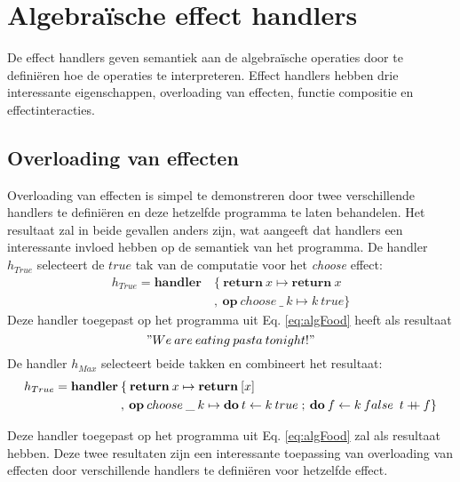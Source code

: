 \section{Algebraïsche effect handlers}
De effect handlers geven semantiek aan de algebraïsche operaties door te definiëren hoe de operaties te interpreteren. Effect handlers hebben drie interessante eigenschappen, overloading van effecten, functie compositie en effectinteracties.

\subsection{Overloading van effecten}
Overloading van effecten is simpel te demonstreren door twee verschillende handlers te definiëren en deze hetzelfde programma te laten behandelen. Het resultaat zal in beide gevallen anders zijn, wat aangeeft dat handlers een interessante invloed hebben op de semantiek van het programma. \newline 
De handler $h_{True}$ selecteert de $true$ tak van de computatie voor het \textit{choose} effect:
\begin{equation}
    \begin{split}
        h_{True} = \textbf{handler} \: & \{ \: \textbf{return}\:x \mapsto \textbf{return}\:x \\
         & , \: \textbf{op}\:choose\:\_\:k \mapsto k \: true\}
    \end{split}
\end{equation}
Deze handler toegepast op het programma uit Eq. \ref{eq:algFood} heeft als resultaat
\begin{equation}
    "We\:are\:eating\:pasta\:tonight!"
\end{equation} 
De handler $h_{Max}$ selecteert beide takken en combineert het resultaat:
\begin{equation}
    \begin{split}
        h_{True} = \textbf{handler} \: & \{ \: \textbf{return}\:x \mapsto \textbf{return}\:[x] \\
        & , \: \textbf{op}\:choose\:\_\:k \mapsto \textbf{do}\:t \leftarrow k \: true\;;\: \textbf{do}\:f \leftarrow k\:false\;\:t \mathbin{{+}\mspace{-8mu}{+}} f \}
    \end{split}
\end{equation}

Deze handler toegepast op het programma uit Eq. \ref{eq:algFood} zal als resultaat
\begin{equation}
    ["We\:are\:eating\:pasta\:tonight!",\:"We\:are\:eating\:pizza\:tonight!"]
\end{equation} 
hebben. Deze twee resultaten zijn een interessante toepassing van overloading van effecten door verschillende handlers te definiëren voor hetzelfde effect.

